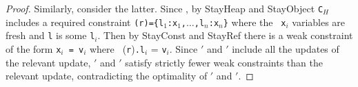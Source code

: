 \begin{proof}
Similarly, consider the latter.  Since  ,
    by {\sc StayHeap} and {\sc StayObject}
    {\tt C$_H$} includes a required constraint {\tt \Deref(r)=\{l$_1$:x$_1$,$\ldots$,l$_n$:x$_n$\}} where the {\tt
    x$_i$} variables are fresh and {\tt l} is some {\tt l$_i$}.   Then
  by  {\sc StayConst} and {\sc StayRef} there is a weak constraint of
  the form {\tt x$_i$ = v$_i$}
where {\tt
      \Huid}({\tt r}){\tt .l$_i$} = {\tt v$_i$}.  Since {\tt \Euid$'$} and {\tt \Huid$'$} include all
the updates of the relevant update, {\tt \Euid$'$} and {\tt \Huid$'$}
satisfy strictly fewer weak constraints than the relevant update,
contradicting the optimality of {\tt \Euid$'$} and {\tt \Huid$'$}.

\end{proof}


